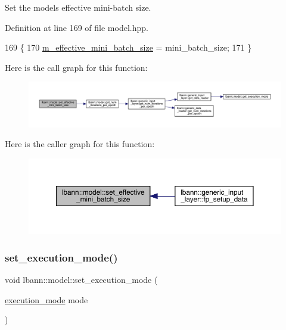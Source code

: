 Set the model\textquotesingle{}s effective mini-\/batch size. 

Definition at line 169 of file model.\+hpp.


\begin{DoxyCode}
169                                                                  \{
170     \hyperlink{classlbann_1_1model_a4887fd2816e7c51b24cb8bf8e4a80a1c}{m\_effective\_mini\_batch\_size} = mini\_batch\_size;
171   \}
\end{DoxyCode}
Here is the call graph for this function\+:\nopagebreak
\begin{figure}[H]
\begin{center}
\leavevmode
\includegraphics[width=350pt]{classlbann_1_1model_aa64829cba8a84928a396893172a1d116_cgraph}
\end{center}
\end{figure}
Here is the caller graph for this function\+:\nopagebreak
\begin{figure}[H]
\begin{center}
\leavevmode
\includegraphics[width=350pt]{classlbann_1_1model_aa64829cba8a84928a396893172a1d116_icgraph}
\end{center}
\end{figure}
\mbox{\label{classlbann_1_1model_a375372b5b864ffbc4eaa0963f6939f65}} 
\subsubsection{\texorpdfstring{set\+\_\+execution\+\_\+mode()}{set\_execution\_mode()}}
{\footnotesize\ttfamily void lbann\+::model\+::set\+\_\+execution\+\_\+mode (\begin{DoxyParamCaption}\item[{\hyperlink{base_8hpp_a2781a159088df64ed7d47cc91c4dc0a8}{execution\+\_\+mode}}]{mode }\end{DoxyParamCaption})\hspace{0.3cm}{\ttfamily [inline]}}

